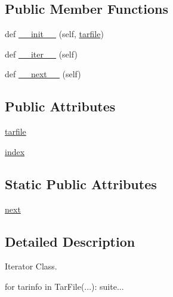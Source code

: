 \subsection*{Public Member Functions}
\begin{DoxyCompactItemize}
\item 
def \hyperlink{classpip_1_1__vendor_1_1distlib_1_1__backport_1_1tarfile_1_1TarIter_aca2047e04c86a08ad04b63659b8053fd}{\+\_\+\+\_\+init\+\_\+\+\_\+} (self, \hyperlink{classpip_1_1__vendor_1_1distlib_1_1__backport_1_1tarfile_1_1TarIter_ae8dfb5ca457afd1cff1f05b57b0a0eae}{tarfile})
\item 
def \hyperlink{classpip_1_1__vendor_1_1distlib_1_1__backport_1_1tarfile_1_1TarIter_a28907d90496c0ea24bdd583d41eb484c}{\+\_\+\+\_\+iter\+\_\+\+\_\+} (self)
\item 
def \hyperlink{classpip_1_1__vendor_1_1distlib_1_1__backport_1_1tarfile_1_1TarIter_af67b8320f49fc25d7f10d0f61c738110}{\+\_\+\+\_\+next\+\_\+\+\_\+} (self)
\end{DoxyCompactItemize}
\subsection*{Public Attributes}
\begin{DoxyCompactItemize}
\item 
\hyperlink{classpip_1_1__vendor_1_1distlib_1_1__backport_1_1tarfile_1_1TarIter_ae8dfb5ca457afd1cff1f05b57b0a0eae}{tarfile}
\item 
\hyperlink{classpip_1_1__vendor_1_1distlib_1_1__backport_1_1tarfile_1_1TarIter_a5494d27596e54dc54ffc17458df657a5}{index}
\end{DoxyCompactItemize}
\subsection*{Static Public Attributes}
\begin{DoxyCompactItemize}
\item 
\hyperlink{classpip_1_1__vendor_1_1distlib_1_1__backport_1_1tarfile_1_1TarIter_a5bf2bf32dfe38c0645f8398fe251ddc7}{next}
\end{DoxyCompactItemize}


\subsection{Detailed Description}
\begin{DoxyVerb}Iterator Class.

   for tarinfo in TarFile(...):
       suite...
\end{DoxyVerb}
 

